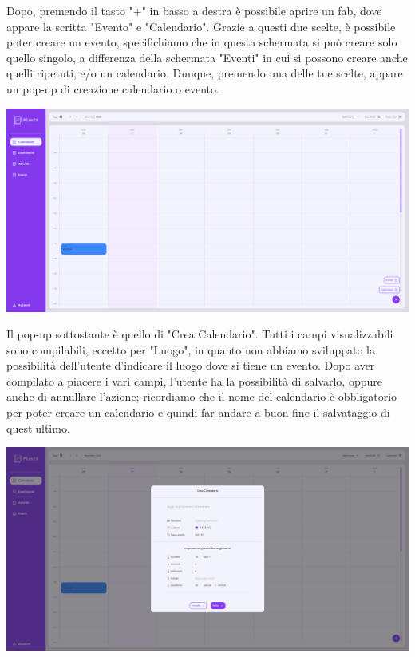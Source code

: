 Dopo, premendo il tasto "+" in basso a destra è possibile aprire un fab, dove appare la scritta "Evento" e "Calendario". Grazie a questi due scelte, è possibile poter creare un evento, specifichiamo che in questa schermata si può creare solo quello singolo, a differenza della schermata "Eventi" in cui si possono creare anche quelli ripetuti, e/o un calendario. Dunque, premendo una delle tue scelte, appare un pop-up di creazione calendario o evento.

\begin{center}
    \includegraphics[width=1\textwidth, height=0.3\textheight]{img/png/FrontEnd/Calendario/calendario_creazione.png}
\end{center}

Il pop-up sottostante è quello di "Crea Calendario". Tutti i campi visualizzabili sono compilabili, eccetto per "Luogo", in quanto non abbiamo sviluppato la possibilità dell'utente d'indicare il luogo dove si tiene un evento. Dopo aver compilato a piacere i vari campi, l'utente ha la possibilità di salvarlo, oppure anche di annullare l'azione; ricordiamo che il nome del calendario è obbligatorio per poter creare un calendario e quindi far andare a buon fine il salvataggio di quest'ultimo.

\begin{center}
    \includegraphics[width=1\textwidth, height=0.3\textheight]{img/png/FrontEnd/Calendario/calendario_creaCalendario.png}
\end{center}

